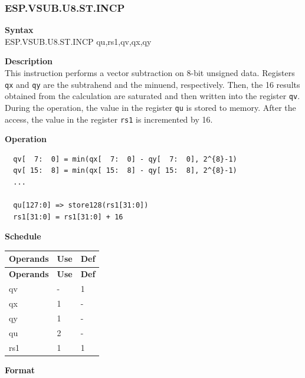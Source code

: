 \newpage
\subsubsection{ESP.VSUB.U8.ST.INCP}\label{instruction:ESPVSUBU8STINCP}
\textbf{Syntax}\\
ESP.VSUB.U8.ST.INCP qu,rs1,qv,qx,qy

\textbf{Description}\\
This instruction performs a vector subtraction on 8-bit unsigned data. Registers \lstinline{qx} and \lstinline{qy} are the subtrahend and the minuend, respectively. Then, the 16 results obtained from the calculation are saturated and then written into the register \lstinline{qv}. \\ During the operation, the value in the register \lstinline{qu} is stored to memory. After the access, the value in the register \lstinline{rs1} is incremented by 16.

\textbf{Operation}\\
\begin{lstlisting}
  qv[  7:  0] = min(qx[  7:  0] - qy[  7:  0], 2^{8}-1)
  qv[ 15:  8] = min(qx[ 15:  8] - qy[ 15:  8], 2^{8}-1)
  ...

  qu[127:0] => store128(rs1[31:0])
  rs1[31:0] = rs1[31:0] + 16
\end{lstlisting}

\textbf{Schedule}\\
\begin{longtable}[c]{|l|l|l|}
    \hline
    \rowcolor{lightgray}
    \textbf{Operands} & \textbf{Use} & \textbf{Def} \\\hline
    \endfirsthead
    \hline
    \rowcolor{lightgray}
     \textbf{Operands} & \textbf{Use} & \textbf{Def} \\\hline
    \endhead
    \hline
    \endfoot

  qv & - & 1 \\\hline
    qx & 1 & - \\\hline
    qy & 1 & - \\\hline
    qu & 2 & - \\\hline
    rs1 & 1 & 1

\end{longtable}

\textbf{Format}\\

